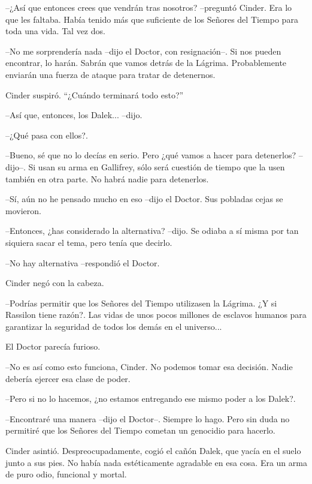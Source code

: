 --¿Así que entonces crees que vendrán tras nosotros? --preguntó Cinder. Era lo que les faltaba. Había tenido más que suficiente de los Señores del Tiempo para toda una vida. Tal vez dos.

--No me sorprendería nada --dijo el Doctor, con resignación--. Si nos pueden encontrar, lo harán. Sabrán que vamos detrás de la Lágrima. Probablemente enviarán una fuerza de ataque para tratar de detenernos.



Cinder suspiró. ``¿Cuándo terminará todo esto?'' 



--Así que, entonces, los Dalek... --dijo.

--¿Qué pasa con ellos?.

--Bueno, sé que no lo decías en serio. Pero ¿qué vamos a hacer para detenerlos? --dijo--. Si usan su arma en Gallifrey, sólo será cuestión de tiempo que la usen también en otra parte. No habrá nadie para detenerlos.

--Sí, aún no he pensado mucho en eso --dijo el Doctor. Sus pobladas cejas se movieron.

--Entonces, ¿has considerado la alternativa? --dijo. Se odiaba a sí misma por tan siquiera sacar el tema, pero tenía que decirlo.

--No hay alternativa --respondió el Doctor.



Cinder negó con la cabeza. 



--Podrías permitir que los Señores del Tiempo utilizasen la Lágrima. ¿Y si Rassilon tiene razón?. Las vidas de unos pocos millones de esclavos humanos para garantizar la seguridad de todos los demás en el universo...



El Doctor parecía furioso. 

--No es así como esto funciona, Cinder. No podemos tomar esa decisión. Nadie debería ejercer esa clase de poder.

--Pero si no lo hacemos, ¿no estamos entregando ese mismo poder a los Dalek?.

--Encontraré una manera --dijo el Doctor--. Siempre lo hago. Pero sin duda no permitiré que los Señores del Tiempo cometan un genocidio para hacerlo.



Cinder asintió. Despreocupadamente, cogió el cañón Dalek, que yacía en el suelo junto a sus pies. No había nada estéticamente agradable en esa cosa. Era un arma de puro odio, funcional y mortal.



